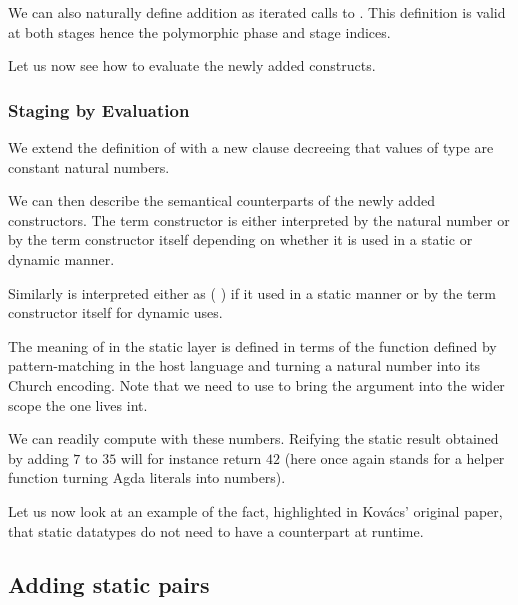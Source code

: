 
We can also naturally define addition as iterated calls to
. This definition is valid at both stages hence
the polymorphic phase and stage indices.

\label{def:add}

Let us now see how to evaluate the newly added constructs.

\subsubsection{Staging by Evaluation}

We extend the definition of  with a new clause decreeing
that values of type  are constant natural numbers.


We can then describe the semantical counterparts of the newly
added constructors.
%
The term constructor  is either interpreted by
the natural number  or by the term constructor itself
depending on whether it is used in a static or dynamic manner.


Similarly  is interpreted either as ( \AF{+}\AS{\_})
if it used in a static manner or by the term constructor itself
for dynamic uses.


The meaning of  in the static layer is defined in
terms of the  function defined by pattern-matching
in the host language and turning a natural number into its
Church encoding. Note that we need to use  to
bring the  argument into the wider scope the 
one lives int.



We can readily compute with these numbers. Reifying the static
result obtained by adding $7$ to $35$ will for instance return
$42$ (here  once again stands for a helper function
turning Agda literals into  numbers).


Let us now look at an example of the fact, highlighted in
Kov{\'{a}}cs' original paper, that static datatypes do not
need to have a counterpart at runtime.

\subsection{Adding static pairs}\label{sec:stagingmodelprod}

